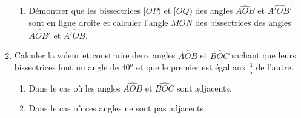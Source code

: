 \documentclass[12 pt]{report}
\theoremstyle{plain}
\newcounter{n}
\begin{document}
\begin{enumerate}
\begin{enumerate}
\item Démontrer que les bissectrices $[OP)$ et $[OQ)$ des angles $\widehat{AOB}$ et $\widehat{A'OB'}$ sont en ligne droite et calculer l'angle $\widehat{MON}$ des bissectrices des angles $\widehat{AOB'}$ et $\widehat{A'OB}$. 
\end{enumerate}
\item Calculer la valeur et construire deux angles $\widehat{AOB}$ et $\widehat{BOC}$ sachant que leurs bissectrices font un angle de $40^o$ et que le premier est égal aux $\frac35$ de l'autre. \begin{enumerate}
\item Dans le cas où les angles $\widehat{AOB}$ et $\widehat{BOC}$ sont adjacents.
\item Dans le cas où ces angles ne sont pas adjacents. 
\end{enumerate}
\end{enumerate}
\end{document}

